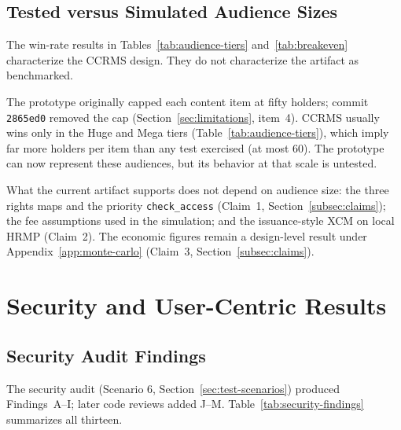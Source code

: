 \subsection{Tested versus Simulated Audience Sizes}\label{subsec:prototype-bound}

The win-rate results in Tables~\ref{tab:audience-tiers} and~\ref{tab:breakeven} characterize the CCRMS design. They do not characterize the artifact as benchmarked.

The prototype originally capped each content item at fifty holders; commit \texttt{2865ed0} removed the cap (Section~\ref{sec:limitations}, item~4). CCRMS usually wins only in the Huge and Mega tiers (Table~\ref{tab:audience-tiers}), which imply far more holders per item than any test exercised (at most 60). The prototype can now represent these audiences, but its behavior at that scale is untested.

What the current artifact supports does not depend on audience size: the three rights maps and the priority \texttt{check\_access} (Claim~1, Section~\ref{subsec:claims}); the fee assumptions used in the simulation; and the issuance-style XCM on local HRMP (Claim~2). The economic figures remain a design-level result under Appendix~\ref{app:monte-carlo} (Claim~3, Section~\ref{subsec:claims}).

\section{Security and User-Centric Results}\label{sec:security-user-results}


\subsection{Security Audit Findings}\label{subsec:security-audit}

The security audit (Scenario 6, Section~\ref{sec:test-scenarios}) produced Findings~A--I; later code reviews added J--M. Table~\ref{tab:security-findings} summarizes all thirteen.

